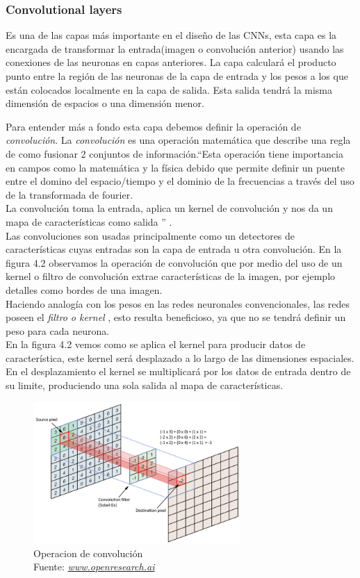 \subsubsection{Convolutional layers}
Es una de las capas más importante en el diseño de las CNNs, esta capa es la encargada de transformar la entrada(imagen o convolución anterior) usando las conexiones de las neuronas en capas anteriores. La capa calculará el producto punto entre la región de las neuronas de la capa de entrada y los pesos a los que están colocados localmente en la capa de salida. Esta salida tendrá la misma dimensión de espacios o una dimensión menor.

Para entender más a fondo esta capa debemos definir la operación de \textit{convolución}.  La \textit{convolución} es una operación matemática que describe una regla de como fusionar 2 conjuntos de información.\textquotedblleft Esta operación tiene importancia en campos como la matemática y la física debido que permite definir un puente entre el domino del espacio/tiempo y el dominio de la frecuencias a través del uso de la transformada de fourier.\\
La convolución toma la entrada, aplica un kernel de convolución y nos da un mapa de características como salida \textquotedblright \cite{book1} .\\
Las convoluciones son usadas principalmente como un detectores de características cuyas entradas son la capa de entrada u otra convolución.
En la figura 4.2 observamos la operación de convolución que por medio del uso de un kernel o filtro de convolución extrae características de la imagen, por ejemplo detalles como bordes de una imagen.\\ Haciendo analogía con los pesos en las redes neuronales convencionales, las redes poseen el \textit{ filtro o kernel }, esto resulta beneficioso, ya que no se tendrá definir un peso para cada neurona.\\ En la figura 4.2 vemos como se aplica el kernel para producir datos de característica, este kernel será desplazado a lo largo de las dimensiones espaciales. En el desplazamiento el kernel se multiplicará por los datos de entrada dentro de su limite, produciendo una sola salida al mapa de características.
\begin{figure}[H]
	\centering
	\includegraphics[width=0.7\textwidth]{Figures/convolucion.jpeg}
	\caption{Operacion de convolución \\ Fuente:  \href{http://openresearch.ai/t/network-in-network/39}{\textit{www.openresearch.ai}}}
	\label{convolucion}
\end{figure} 

